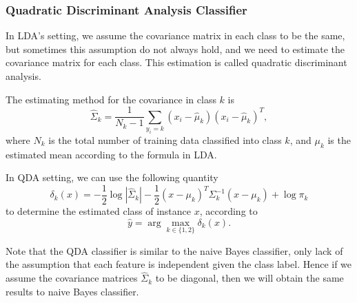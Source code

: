 \documentclass[english]{article}
\begin{document}
\subsubsection{Quadratic Discriminant Analysis Classifier}
\par In LDA's setting, we assume the covariance matrix in each class to be the same, but sometimes this assumption do not always hold, and we need to estimate the covariance matrix for each class. This estimation is called quadratic discriminant analysis.
\par The estimating method for the covariance in class $k$ is
\begin{equation}
	\hat{\Sigma}_{k} = \frac{1}{N_{k} - 1}\sum_{y_{i} = k}(x_{i} - \hat{\mu}_{k})(x_{i} - \hat{\mu}_{k})^{T},
\end{equation}
where $N_{k}$ is the total number of training data classified into class $k$, and $\mu_{k}$ is the estimated mean according to the formula in LDA.
\par In QDA setting, we can use the following quantity
\begin{equation}
	\delta_{k}(x) = -\frac{1}{2}\log|\hat{\Sigma}_{k}| - \frac{1}{2}(x - \mu_{k})^{T}\Sigma_{k}^{-1}(x - \mu_{k}) + \log\pi_{k}
\end{equation}
to determine the estimated class of instance $x$, according to
\begin{equation}
	\hat{y} = \arg\max_{k\in\{1, 2\}}\delta_{k}(x).
\end{equation}
\par Note that the QDA classifier is similar to the naive Bayes classifier, only lack of the assumption that each feature is independent given the class label. Hence if we assume the covariance matrices $\hat{\Sigma}_{k}$ to be diagonal, then we will obtain the same results to naive Bayes classifier.
\end{document}
